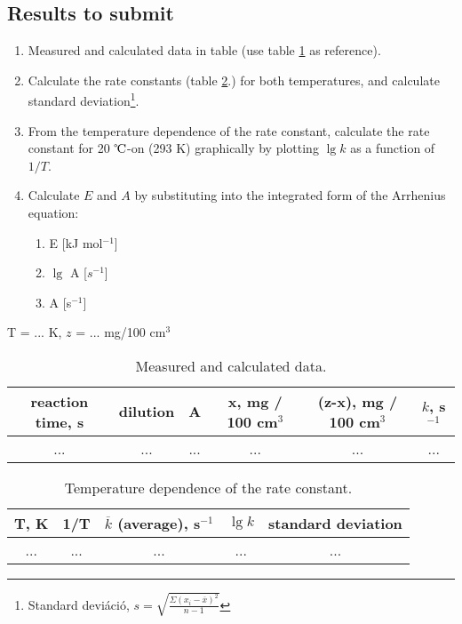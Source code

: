 \subsection{Results to submit}

\begin{enumerate}
\item Measured and calculated data in table (use table \ref{table:tablazatos} as reference).
\item Calculate the rate constants (table \ref{table:seb}.) for both temperatures, and calculate standard deviation\footnote{Standard deviáció, $s=\sqrt{\frac{\Sigma(x_i-\overline{x})^2}{n-1}}$}.
\item From the temperature dependence of the rate constant, calculate the rate constant for 20 $\celsius$-on (293 K) graphically by plotting $\lg k$ as a function of $1/T$.
\item Calculate $E$ and $A$ by substituting into the integrated form of the Arrhenius equation:
	\begin{enumerate}
		\item E [kJ mol$^{-1}$]
		\item $\lg$ A [$s^{-1}$]
		\item A [s$^{-1}$]
	\end{enumerate}
\end{enumerate}

\begin{table}[h!]
\caption{Measured and calculated data.}
\centering
T = ... K, $z$ = ... mg/100 cm$^3$
\begin{tabular}{|c|c|c|c|c|c|}
\hline
reaction time, s&dilution&A&x, mg / 100 cm$^3$ &(z-x), mg / 100 cm$^3$ & $k$, s$^{-1}$ \\
\hline
... & ... & ... & ... & ... & ... \\
\end{tabular}
\label{table:tablazatos}
\end{table}

\begin{table}[h!]
\caption{Temperature dependence of the rate constant.}
\centering
\begin{tabular}{|c|c|c|c|c|}
\hline
T, K& 1/T & $\overline{k}$ (average), s$^{-1}$ & $\lg k$ & standard deviation \\
\hline
... & ... & ... & ... & ... \\
\end{tabular}
\label{table:seb}
\end{table}

\vfill

